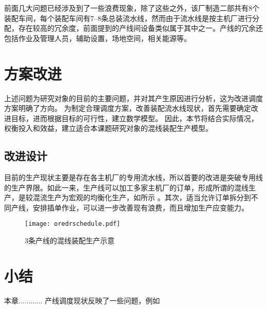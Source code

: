 前面几大问题已经涉及到了一些浪费现象，除了这些之外，该厂制造二部共有8个装配车间，每个装配车间有7--8条总装流水线，然而由于流水线是按主机厂进行分配，存在较高的冗余度，前面提到的产线间设备类似属于其中之一。产线的冗余还包括作业及管理人员，辅助设置，场地空间，相关能源等。

\section{方案改进}
上述问题为研究对象的目前的主要问题，并对其产生原因进行分析，这为改进调度方案明确了方向。
为制定合理调度方案，改善装配流水线现状，首先需要确定改进目标，进而根据目标的可行性，建立数学模型。
因此，本节将结合实际情况，权衡投入和效益，建立适合本课题研究对象的混线装配生产模型。
\subsection{改进设计}
目前的生产现状主要是存在各主机厂的专用流水线，所以首要的改进是突破专用线的生产界限。如此一来，生产线可以加工多家主机厂的订单，形成所谓的混线生产，是较混流生产为宏观的均衡化生产，如所示
。其次，适当允许订单拆分到不同产线，安排插单作业，可以进一步改善现有浪费，而且增加生产应变能力。
\begin{figure}[h]
\centering
\texttt{[image: oredrschedule.pdf]}
\caption{3条产线的混线装配生产示意\label{fig:orderschedule}}
\end{figure}

\section{小结}
本章............
产线调度现状反映了一些问题，例如

